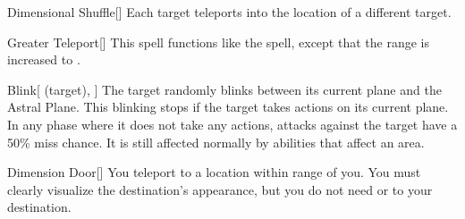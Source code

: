 \lowercase{\hypertarget{spell:Dimensional Shuffle}{}}\label{spell:Dimensional Shuffle}
\begin{freeability}[Rank 3]{\hypertarget{spell:Dimensional Shuffle}{Dimensional Shuffle}}[]
Each target teleports into the location of a different target.
\end{freeability}
\vspace{0.25em}



\lowercase{\hypertarget{spell:Greater Teleport}{}}\label{spell:Greater Teleport}
\begin{freeability}[Rank 3]{\hypertarget{spell:Greater Teleport}{Greater Teleport}}[]
This spell functions like the  spell, except that the range is increased to \rnglong.
\end{freeability}
\vspace{0.25em}



\lowercase{\hypertarget{spell:Blink}{}}\label{spell:Blink}
\begin{attuneability}[Rank 4]{\hypertarget{spell:Blink}{Blink}}[ (target), ]
The target randomly blinks between its current plane and the Astral Plane.
This blinking stops if the target takes actions on its current plane.
In any phase where it does not take any actions,  attacks against the target have a 50\% miss chance.
It is still affected normally by abilities that affect an area.
\end{attuneability}
\vspace{0.25em}



\lowercase{\hypertarget{spell:Dimension Door}{}}\label{spell:Dimension Door}
\begin{freeability}[Rank 4]{\hypertarget{spell:Dimension Door}{Dimension Door}}[]
You teleport to a location within \rngext range of you.
You must clearly visualize the destination's appearance, but you do not need  or  to your destination.
\end{freeability}
\vspace{0.25em}



